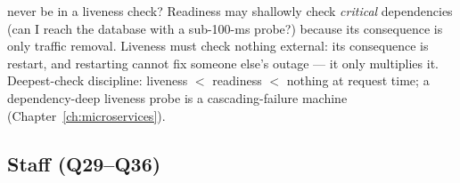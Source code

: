 \begin{enumerate}[label=\textbf{Q\arabic*.}, leftmargin=1.6cm, start=21]
{        never be in a liveness check?}
        Readiness may shallowly check \emph{critical} dependencies
        (can I reach the database with a sub-100-ms probe?) because its
        consequence is only traffic removal. Liveness must check nothing
        external: its consequence is restart, and restarting cannot fix
        someone else's outage --- it only multiplies it. Deepest-check
        discipline: liveness $<$ readiness $<$ nothing at request time;
        a dependency-deep liveness probe is a cascading-failure machine
        (Chapter~\ref{ch:microservices}).
\end{enumerate}

\subsection*{Staff (Q29--Q36)}
